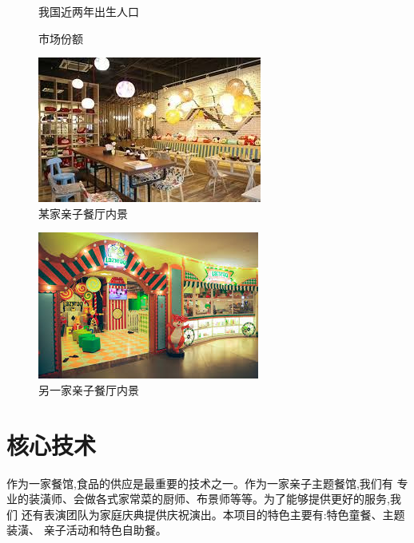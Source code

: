 \begin{figure}[ htbp ]
        \centering
        \caption{我国近两年出生人口}
        
\end{figure}
\begin{figure}[ htbp ]
        \centering
        \caption{市场份额}
        \label{fig:market-share}
        
\end{figure}
\begin{figure}[ htbp ]
        \centering
        \caption{某家亲子餐厅内景}
        \includegraphics{../images/interior/内景1}
\end{figure}
\begin{figure}[ htbp ]
        \centering
        \caption{另一家亲子餐厅内景}
        \includegraphics{../images/interior/内景2}
\end{figure}

\section{核心技术}
作为一家餐馆,食品的供应是最重要的技术之一。作为一家亲子主题餐馆,我们有
专业的装潢师、会做各式家常菜的厨师、布景师等等。为了能够提供更好的服务,我们
还有表演团队为家庭庆典提供庆祝演出。本项目的特色主要有:特色童餐、主题装潢、
亲子活动和特色自助餐。

